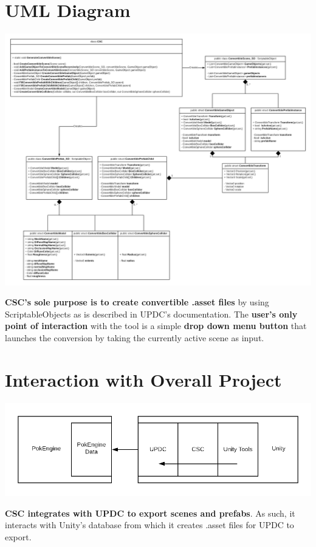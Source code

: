 \documentclass[12pt,a4paper]{article}
\begin{document}
\section{UML Diagram}
\begin{center}
\includegraphics[scale=0.25]{CSCUML}
\end{center}
\textbf{CSC's sole purpose is to create convertible .asset files} by using ScriptableObjects as is described in UPDC's documentation. The \textbf{user's only point of interaction} with the tool is a simple \textbf{drop down menu button} that launches the conversion by taking the currently active scene as input.

\section{Interaction with Overall Project}
\begin{center}
\includegraphics[scale=0.5]{CSCLocation}
\end{center}
\textbf{CSC integrates with UPDC to export scenes and prefabs}. As such, it interacts with Unity's database from which it creates .asset files for UPDC to export.
\end{document}
